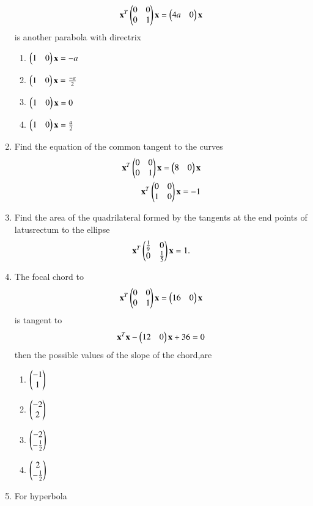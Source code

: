\begin{enumerate}[label=\arabic*.,ref=\thesubsection.\theenumi]
    \begin{align} 
    \mathbf {x}^T\begin{pmatrix}0 & 0 \\0 & 1\end{pmatrix}\mathbf {x}=\begin{pmatrix}4a&0\end{pmatrix}\mathbf{x}
    \end{align} is another parabola with directrix 
    \begin{enumerate}
    \item $\begin{pmatrix}1&0\end{pmatrix}\mathbf{x}=-a$
    \item $\begin{pmatrix}1&0\end{pmatrix}\mathbf{x}=\frac{-a}{2}$
    \item $\begin{pmatrix}1&0\end{pmatrix}\mathbf{x}=0$
    \item $\begin{pmatrix}1&0\end{pmatrix}\mathbf{x}=\frac{a}{2}$
    \end{enumerate}
\item Find the equation of the common tangent to the curves 
	\begin{align}
    \mathbf{x}^T \begin{pmatrix}0 & 0 \\0 & 1\end{pmatrix}\mathbf{x}=\begin{pmatrix}8&0\end{pmatrix}\mathbf{x}\\
    \mathbf{x}^T \begin{pmatrix}0 & 0 \\ 1& 0\end{pmatrix}\mathbf{x}=-1
    \end{align}
\item Find the area of the quadrilateral formed by the tangents at the end points of latusrectum to the ellipse
    \begin{align}
    \mathbf{x}^T \begin{pmatrix}\frac{1}{9} & 0 \\0 & \frac{1}{5}\end{pmatrix} \mathbf{x}=1.
    \end{align}
\item The focal chord to
    \begin{align}
    \mathbf{x}^T \begin{pmatrix}0 & 0 \\0 & 1\end{pmatrix}\mathbf{x}=\begin{pmatrix}16&0\end{pmatrix}\mathbf{x}
    \end{align}
    is tangent to
    \begin{align}
    \mathbf {x}^T\mathbf{x}-\begin{pmatrix}12&0\end{pmatrix}\mathbf{x}+36=0
    \end{align} then the possible values of the slope of the chord,are 
    \begin{enumerate}
    \item $\begin{pmatrix}-1\\1\end{pmatrix}$
    \item $\begin{pmatrix}-2\\2\end{pmatrix}$
    \item $\begin{pmatrix}-2\\ -\frac{1}{2}\end{pmatrix}$
    \item $\begin{pmatrix}2\\ -\frac{1}{2}\end{pmatrix}$
    \end{enumerate}
\item For hyperbola 

\end{enumerate}
